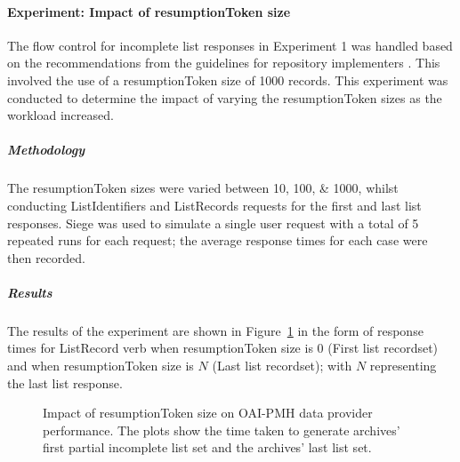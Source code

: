 \paragraph{Experiment: Impact of resumptionToken size}
\label{sec:evaluation:performance:oaipmh-data-provider:experiment3}

The flow control for incomplete list responses in Experiment 1 was handled based on the recommendations from the guidelines for repository implementers \citep{Lagoze2002a}. This involved the use of a resumptionToken size of \num{1000} records. This experiment was conducted to determine the impact of varying the resumptionToken sizes as the workload increased.

\subparagraph{Methodology} %

The resumptionToken sizes were varied between \numlist{10;100;1000}, whilst conducting ListIdentifiers and ListRecords requests for the first and last list responses. Siege was used to simulate a single user request with a total of 5 repeated runs for each request; the average response times for each case were then recorded.

\subparagraph{Results}

The results of the experiment are shown in Figure~\ref{fig:experimentation:performance:oaipmh:resumptiontoken-size} in the form of response times for ListRecord verb when resumptionToken size is 0 (First list recordset) and when resumptionToken size is $N$ (Last list recordset); with $N$ representing the last list response.

\begin{figure}
 \centering
 \framebox[\textwidth]{%

 }
 \caption[Impact of resumptionToken size on OAI-PMH]{Impact of resumptionToken size on OAI-PMH data provider performance. The plots show the time taken to generate archives' first partial incomplete list set and the archives' last list set.}
 \label{fig:experimentation:performance:oaipmh:resumptiontoken-size}
\end{figure}

% 
\begin{comment}
\tablespacing

\bodyspacing
\end{comment}

